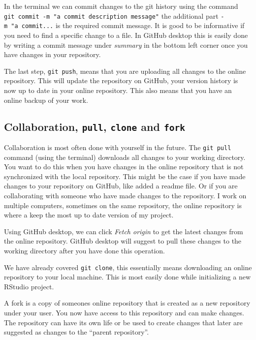 \documentclass[
  11pt,
  letterpaper,
]{scrbook}
\begin{document}
In the terminal we can commit changes to the git history using the
command \texttt{git\ commit\ -m\ "a\ commit\ description\ message"} the
additional part \texttt{-m\ "a\ commit...} is the required commit
message. It is good to be informative if you need to find a specific
change to a file. In GitHub desktop this is easily done by writing a
commit message under \emph{summary} in the bottom left corner once you
have changes in your repository.

The last step, \texttt{git\ push}, means that you are uploading all
changes to the online repository. This will update the repository on
GitHub, your version history is now up to date in your online
repository. This also means that you have an online backup of your work.

\hypertarget{collaboration-pull-clone-and-fork}{%
\subsection{\texorpdfstring{Collaboration, \texttt{pull}, \texttt{clone}
and
\texttt{fork}}{Collaboration, pull, clone and fork}}\label{collaboration-pull-clone-and-fork}}

Collaboration is most often done with yourself in the future. The
\texttt{git\ pull} command (using the terminal) downloads all changes to
your working directory. You want to do this when you have changes in the
online repository that is not synchronized with the local repository.
This might be the case if you have made changes to your repository on
GitHub, like added a readme file. Or if you are collaborating with
someone who have made changes to the repository. I work on multiple
computers, sometimes on the same repository, the online repository is
where a keep the most up to date version of my project.

Using GitHub desktop, we can click \emph{Fetch origin} to get the latest
changes from the online repository. GitHub desktop will suggest to pull
these changes to the working directory after you have done this
operation.

We have already covered \texttt{git\ clone}, this essentially means
downloading an online repository to your local machine. This is most
easily done while initializing a new RStudio project.

A fork is a copy of someones online repository that is created as a new
repository under your user. You now have access to this repository and
can make changes. The repository can have its own life or be used to
create changes that later are suggested as changes to the ``parent
repository''.
\end{document}

